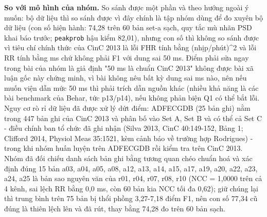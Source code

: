 \documentclass[12pt,a4paper]{article}
\begin{document}
\noindent \textbf{\color{tdtblue}So với mô hình của nhóm.} So sánh được một phần và theo hướng ngoài ý muốn: bộ dữ liệu thì so sánh được vì đây chính là tập nhóm dùng để đo xuyên bộ dữ liệu (con số hiện hành: 74,28 trên 60 bản set-a sạch, quy tắc mù nhãn PSD khai báo trước; \texttt{peakprob} hậu kiểm 82,01), nhưng con số thì không so sánh được vì tiêu chí chính thức của CinC 2013 là lỗi FHR tính bằng (nhịp/phút)\textasciicircum{}2 và lỗi RR tính bằng ms chứ không phải F1 với dung sai 50 ms. Điểm phải sửa ngay trong bài của nhóm là giả định "50 ms là chuẩn CinC 2013" không được bài xã luận gốc này chứng minh, vì bài không nêu bất kỳ dung sai ms nào, nên nếu muốn viện dẫn mức 50 ms thì phải trích dẫn nguồn khác (nhiều khả năng là các bài benchmark của Behar, tức p13/p14), nếu không phản biện Q1 có thể bắt lỗi. Nguy cơ rò rỉ dữ liệu đã được xử lý dứt điểm: ADFECGDB (25 bản ghi) nằm trong 447 bản ghi của CinC 2013 và phân bố vào Set A, Set B và có thể cả Set C - điều chính ban tổ chức đã ghi nhận (Silva 2013, CinC 40:149-152, Bảng 1; Clifford 2014, Physiol Meas 35:1521, kèm cảnh báo về trường hợp Rodrigues) - trong khi nhóm huấn luyện trên ADFECGDB rồi kiểm tra trên CinC 2013. Nhóm đã đối chiếu danh sách bản ghi bằng tương quan chéo chuẩn hoá và xác định đúng 15 bản a03, a04, a05, a08, a12, a13, a14, a15, a17, a19, a20, a22, a23, a24, a25 là bản sao nguyên văn của r01, r04, r07, r08, r10 (NCC = 1,0000 trên cả 4 kênh, sai lệch RR bằng 0,0 ms, còn 60 bản kia NCC tối đa 0,62); giữ chúng lại thì trung bình trên 75 bản bị thổi phồng 3,27-7,18 điểm F1, nên con số 77,34 cũ đúng là thiên lệch lên và đã rút, thay bằng 74,28 đo trên 60 bản sạch.\par\vspace{3pt}
\end{document}
